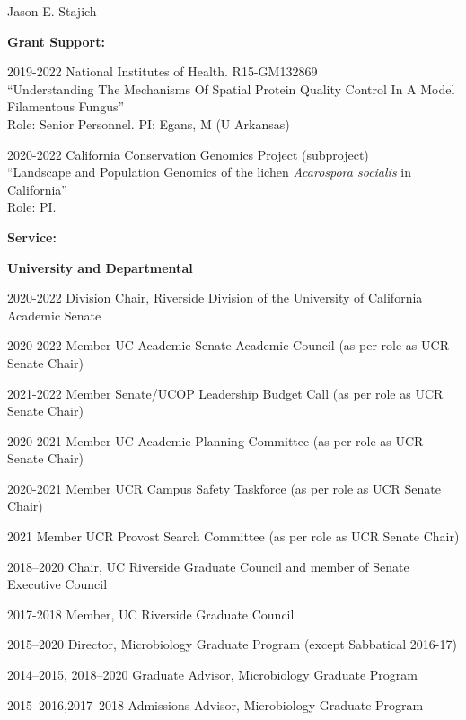 \documentclass[10pt]{article}
\begin{document}
\begin{cv}{\centerline{Jason E. Stajich}}
\begin{cvlistcompact}{\bf Grant Support:}
\item [2019-2022] National Institutes of Health. R15-GM132869 \\
  ``Understanding The Mechanisms Of Spatial Protein Quality Control In
  A Model Filamentous Fungus'' \\
Role: Senior Personnel. PI: Egans, M (U Arkansas)

\item [2020-2022] California Conservation Genomics Project (subproject) \\
  ``Landscape and Population Genomics of the lichen \textit{Acarospora socialis} in California''  \\
Role: PI.

\end{cvlistcompact}

\setlength{\cvlabelwidth}{18mm}

\begin{cvlistcompact}{\bf Service:}
\item[{\bf University and Departmental}]
\item [2020-2022] Division Chair, Riverside Division of the University of California Academic Senate
\item [2020-2022] Member UC Academic Senate Academic Council (as per role as UCR Senate Chair)
\item [2021-2022] Member Senate/UCOP Leadership Budget Call (as per role as UCR Senate Chair)
\item [2020-2021] Member UC Academic Planning Committee (as per role as UCR Senate Chair)
\item [2020-2021] Member UCR Campus Safety Taskforce (as per role as UCR Senate Chair)
\item [2021] Member UCR Provost Search Committee (as per role as UCR Senate Chair)
\item [2018--2020] Chair, UC Riverside Graduate Council and member of Senate Executive Council
\item [2017-2018] Member, UC Riverside Graduate Council
\item [2015--2020] Director, Microbiology Graduate Program (except Sabbatical 2016-17)
\item [2014--2015, 2018--2020] Graduate Advisor, Microbiology Graduate Program
\item [2015--2016,2017--2018] Admissions Advisor, Microbiology Graduate Program
\\


\end{cvlistcompact}
\end{cv}
\end{document}
